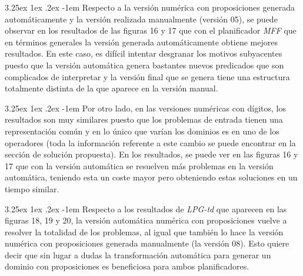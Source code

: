 \documentclass{article}
\makeatletter
\renewcommand\paragraph{\@startsection{paragraph}{5}{\z@}%
      {3.25ex \@plus1ex \@minus.2ex}%
      {-1em}%
      {\normalfont\normalsize\bfseries}}
\makeatother
\begin{document}
    \paragraph{}
    Respecto a la versión numérica con proposiciones generada automáticamente y la versión realizada manualmente (versión 05), se puede observar en los resultados de las figuras 16 y 17 que con el planificador \textit{MFF} que en términos generales la versión generada automáticamente obtiene mejores resultados. En este caso, es difícil intentar desgranar los motivos subyacentes puesto que la versión automática genera bastantes nuevos predicados que son complicados de interpretar y la versión final que se genera tiene una estructura totalmente distinta de la que aparece en la versión manual.
    
    \paragraph{}
    Por otro lado, en las versiones numéricas con dígitos, los resultados son muy similares puesto que los problemas de entrada tienen una representación común y en lo único que varían los dominios es en uno de los operadores (toda la información referente a este cambio se puede encontrar en la sección de solución propuesta). En los resultados, se puede ver en las figuras 16 y 17 que con la versión automática se resuelven más problemas en la versión automática, teniendo esta un coste mayor pero obteniendo estas soluciones en un tiempo similar.
    
    \paragraph{}
    Respecto a los resultados de \textit{LPG-td} que aparecen en las figuras 18, 19 y 20, la versión automática numérica con proposiciones vuelve a resolver la totalidad de los problemas, al igual que también lo hace la versión numérica con proposiciones generada manualmente (la versión 08). Esto quiere decir que sin lugar a dudas la transformación automática para generar un dominio con proposiciones es beneficiosa para ambos planificadores.
    
\end{document}
